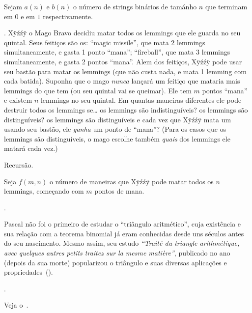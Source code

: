 \hint
Sejam $a(n)$ e $b(n)$ o número de strings binários de tamánho $n$ que terminam em $0$ e em $1$ respectivamente.

\endproblem

\problem.
\def\MM{\ensuremath{\mathtt{M}}}
\def\FB{\ensuremath{\mathtt{F}}}
\def\ST{\ensuremath{\mathtt{B}}}
Xÿźźÿ o Mago Bravo decidiu matar todos os lemmings que ele guarda no seu quintal.
Seus feitiços são os:
\beginul
\li ``magic missile'', que mata 2 lemmings simultaneamente, e gasta 1 ponto ``mana'';
\li ``fireball'', que mata 3 lemmings simultaneamente, e gasta 2 pontos ``mana''.
\endul
\noindent
Alem dos feitiços, Xÿźźÿ pode usar seu bastão para matar
os lemmings (que não custa nada, e mata 1 lemming com cada batida).
\endgraf
Suponha que o mago \emph{nunca} lançará um feitiço que mataria mais lemmings do
que tem (ou seu quintal vai se queimar).
Ele tem $m$ pontos ``mana'' e existem $n$ lemmings no seu quintal.
Em quantas maneiras diferentes ele pode destruir todos os lemmings se\dots
\beginol
\li os lemmings são indistinguíveis?
\li os lemmings são distinguíveis?
\li os lemmings são distinguíveis e cada vez que Xÿźźÿ mata um usando seu bastão,
ele \emph{ganha} um ponto de ``mana''?
\endol
\noindent
(Para os casos que os lemmings são distinguíveis,
o mago escolhe também \emph{quais} dos lemmings ele matará cada vez.)

\hint
Recursão.

\hint
Seja $f(m,n)$ o número de maneiras que Xÿźźÿ pode matar todos os $n$ lemmings,
começando com $m$ pontos de mana.

\endproblem

\endproblems

\history.

Pascal não foi o primeiro de estudar o ``triângulo aritmético'',
cuja existência e sua relação com a teorema binomial já eram
conhecidas desde uns séculos antes do seu nascimento.
Mesmo assim, seu estudo
\emph{``Traité du triangle arithmétique, avec quelques autres petits traitez
sur la mesme matière''},
publicado no ano  (depois da sua morte)
popularizou o triângulo e suas diversas aplicações e
propriedades~(\cite{pascaltriangle}).

\endhistory

\further.

Veja o~\cite{nivencount}.

\endfurther

\endchapter


